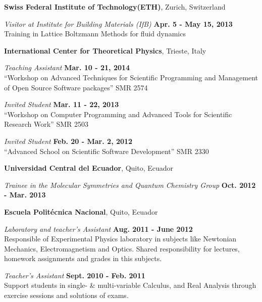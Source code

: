 \documentclass[margin,line]{res}
\newenvironment{list1}{
  \begin{list}{\ding{113}}{%
      \setlength{\itemsep}{0in}
      \setlength{\parsep}{0in} \setlength{\parskip}{0in}
      \setlength{\topsep}{0in} \setlength{\partopsep}{0in} 
      \setlength{\leftmargin}{0.17in}}}{\end{list}}
\begin{document}
\begin{resume}
  {\bf Swiss Federal Institute of Technology(ETH)}, Zurich, Switzerland
  \begin{list1}
    \item[] {\em Visitor at Institute for Building Materials (IfB)} \hfill {\bf 
Apr. 5 - May 15, 2013}\\
    Training in Lattice Boltzmann Methods for fluid dynamics
  \end{list1}

  {\bf International Center for Theoretical Physics}, Trieste, Italy
  \begin{list1}
    \item[] {\em Teaching Assistant} \hfill {\bf Mar. 10 - 21, 2014} \\
    ``Workshop on Advanced Techniques for Scientific Programming and 
Management of Open Source Software packages'' SMR 2574
    \item[] {\em Invited Student} \hfill {\bf Mar. 11 - 22, 2013} \\
    ``Workshop on Computer Programming and Advanced Tools for Scientific
    Research Work'' SMR 2503
    \item[] {\em Invited Student} \hfill {\bf Feb. 20 - Mar. 2, 2012} \\
    ``Advanced School on Scientific Software Development'' SMR 2330
  \end{list1}

  {\bf Universidad Central del Ecuador}, Quito, Ecuador
  \begin{list1}
    \item[] {\em Trainee in the Molecular Symmetries and Quantum Chemistry Group} \hfill {\bf Oct. 2012 - Mar. 2013}
  \end{list1}

  {\bf Escuela Politécnica Nacional}, Quito, Ecuador
  \begin{list1}
   \item[] {\em Laboratory and teacher's Assistant} \hfill {\bf Aug. 2011 - June 2012}\\
    Responsible of Experimental Physics laboratory in subjects
    like Newtonian Mechanics, Electromagnetism and Optics.
    Shared responsibility for lectures, homework assignments and grades in this subjects.\\
   \item[] {\em Teacher's Assistant} \hfill {\bf Sept. 2010 - Feb. 2011}\\
    Support students in single- \& multi-variable Calculus, and Real Analysis through
    exercise sessions and solutions of exams.
  \end{list1}


\end{resume}
\end{document}
